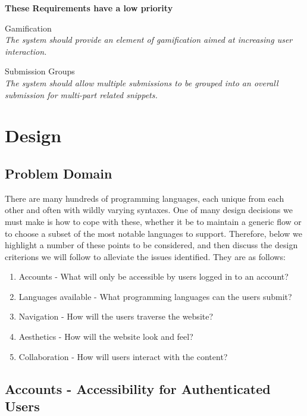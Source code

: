 \textbf{These Requirements have a low priority}

\begin{requirements}[resume]

    \item Gamification \label{gamification} \\
	\textit{The system should provide an element of gamification aimed at increasing user interaction.}

    \item Submission Groups \label{submissiongroups} \\
	\textit{The system should allow multiple submissions to be grouped into an overall submission for multi-part related snippets.}

\end{requirements}


\section{Design}

\subsection{Problem Domain}

There are many hundreds of programming languages, each unique from each other and often with wildly varying syntaxes. 
One of many design decisions we must make is how to cope with these, whether it be to maintain a generic flow or to choose a subset of the most notable languages to support.
Therefore, below we highlight a number of these points to be considered, and then discuss the design criterions we will follow to alleviate the issues identified. They are as follows:

\begin{enumerate}
  \item Accounts - What will only be accessible by users logged in to an account? 
  \item Languages available - What programming languages can the users submit?
  \item Navigation - How will the users traverse the website?
  \item Aesthetics - How will the website look and feel? 
  \item Collaboration - How will users interact with the content?
\end{enumerate}

\subsection{Accounts - Accessibility for Authenticated Users}

